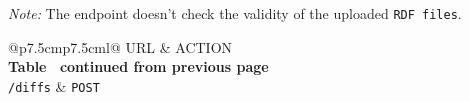 \textit{Note:} The endpoint doesn't check the validity of the uploaded \texttt{RDF files}.

\begin{longtable}[c]{@{}p{7.5cm}p{7.5cm}l@{}}
  \toprule
  URL             & ACTION                                    \\* \midrule
  \endfirsthead
  \multicolumn{3}{c}%
  {{\bfseries Table \thetable\ continued from previous page}} \\
  \endhead
  \bottomrule
  \endfoot
  \endlastfoot
  \texttt{/diffs} & \texttt{POST}                             \\* \bottomrule
  \label{tab:rdf-differ-create-diffs}                         \\
\end{longtable}

